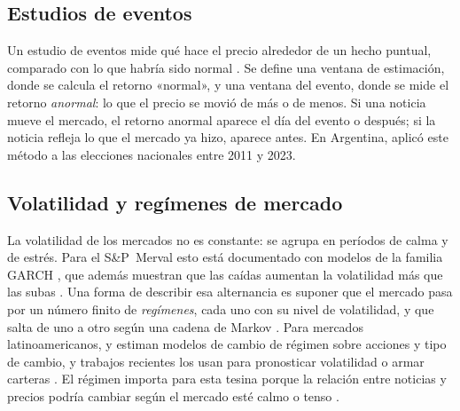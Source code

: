 \subsection{Estudios de eventos}

Un estudio de eventos mide qué hace el precio alrededor de un hecho puntual, comparado con lo
que habría sido normal \citep{mackinlay1997,brown1985}. Se define una ventana de estimación,
donde se calcula el retorno «normal», y una ventana del evento, donde se mide el retorno
\textit{anormal}: lo que el precio se movió de más o de menos. Si una noticia mueve el
mercado, el retorno anormal aparece el día del evento o después; si la noticia refleja lo que
el mercado ya hizo, aparece antes. En Argentina, \citet{calandroni2026} aplicó este método a
las elecciones nacionales entre 2011 y 2023.

\subsection{Volatilidad y regímenes de mercado}

La volatilidad de los mercados no es constante: se agrupa en períodos de calma y de estrés.
Para el S\&P~Merval esto está documentado con modelos de la familia GARCH
\citep{segovia2022,segovia2022wp,larre2019,xenofontos2014}, que además muestran que las
caídas aumentan la volatilidad más que las subas \citep{otuki2008}. Una forma de describir esa
alternancia es suponer que el mercado pasa por un número finito de \textit{regímenes}, cada uno
con su nivel de volatilidad, y que salta de uno a otro según una cadena de Markov
\citep{hamilton1989,rabiner1989,kim1994}. Para mercados latinoamericanos,
\citet{ataurima2016} y \citet{caballero2016} estiman modelos de cambio de régimen sobre
acciones y tipo de cambio, y trabajos recientes los usan para pronosticar volatilidad
\citep{blake2025,ataei2025} o armar carteras \citep{majumder2023}. El régimen importa para esta
tesina porque la relación entre noticias y precios podría cambiar según el mercado esté calmo o
tenso \citep{garcia2013}.

